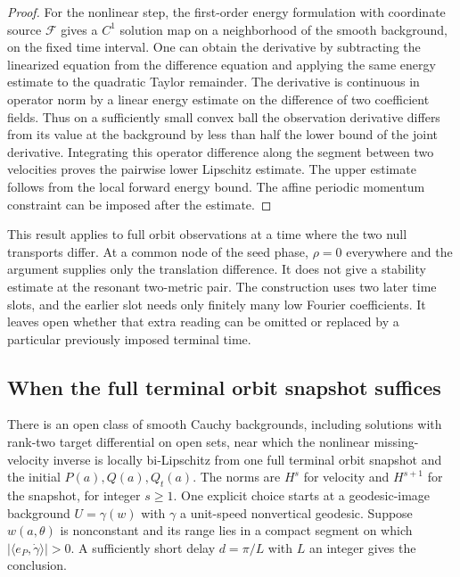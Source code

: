 \begin{proof}
For the nonlinear step, the first-order energy formulation
with coordinate source $\mathcal F$ gives a $C^1$ solution
map on a neighborhood of the smooth background, on the fixed
time interval. One can obtain the derivative by subtracting the
linearized equation from the difference equation and applying
the same energy estimate to the quadratic Taylor remainder.
The derivative is continuous in operator norm by a linear
energy estimate on the difference of two coefficient fields.
Thus on a sufficiently small convex ball the observation
derivative differs from its value at the background by
less than half the lower bound of the joint derivative.
Integrating this operator difference along the segment between
two velocities proves the pairwise lower Lipschitz estimate.
The upper estimate follows from the local forward energy bound.
The affine periodic momentum constraint can be imposed after
the estimate.
\end{proof}

This result applies to full orbit observations at a time
where the two null transports differ.
At a common node of the seed phase, $\rho=0$ everywhere
and the argument supplies only the translation difference.
It does not give a stability estimate at the resonant
two-metric pair. The construction uses two later time
slots, and the earlier slot needs only finitely many
low Fourier coefficients. It leaves open
whether that extra reading can be omitted or replaced
by a particular previously imposed terminal time.

\subsection{When the full terminal orbit snapshot suffices}

\begin{proposition}
\label{prop:two-slice-open}
There is an open class of smooth Cauchy backgrounds,
including solutions with rank-two target differential on
open sets, near which the nonlinear missing-velocity
inverse is locally bi-Lipschitz from one full terminal
orbit snapshot and the initial $P(a),Q(a),Q_t(a)$.
The norms are $H^s$ for velocity and $H^{s+1}$ for the
snapshot, for integer $s\ge1$.
One explicit choice starts at a geodesic-image background
$U=\gamma(w)$ with $\gamma$ a unit-speed nonvertical
geodesic. Suppose $w(a,\theta)$ is nonconstant and its
range lies in a compact segment on which
$|\langle e_P,\dot\gamma\rangle|>0$.
A sufficiently short delay $d=\pi/L$ with $L$ an integer
gives the conclusion.
\end{proposition}

